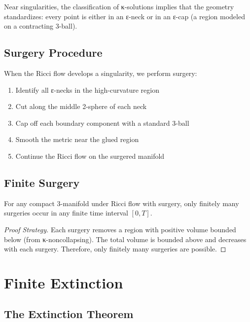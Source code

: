 Near singularities, the classification of κ-solutions implies that the geometry standardizes: every point is either in an ε-neck or in an ε-cap (a region modeled on a contracting 3-ball).

\section{Surgery Procedure}

When the Ricci flow develops a singularity, we perform surgery:
\begin{enumerate}
\item Identify all ε-necks in the high-curvature region
\item Cut along the middle 2-sphere of each neck
\item Cap off each boundary component with a standard 3-ball
\item Smooth the metric near the glued region
\item Continue the Ricci flow on the surgered manifold
\end{enumerate}

\section{Finite Surgery}

\begin{theorem}
\label{thm:finite_surgery}
\leanok
{}
For any compact 3-manifold under Ricci flow with surgery, only finitely many surgeries occur in any finite time interval $[0, T]$.
\end{theorem}

\begin{proof}[Proof Strategy]
Each surgery removes a region with positive volume bounded below (from κ-noncollapsing). The total volume is bounded above and decreases with each surgery. Therefore, only finitely many surgeries are possible.
\end{proof}

\chapter{Finite Extinction}
\label{chap:extinction}

\section{The Extinction Theorem}

